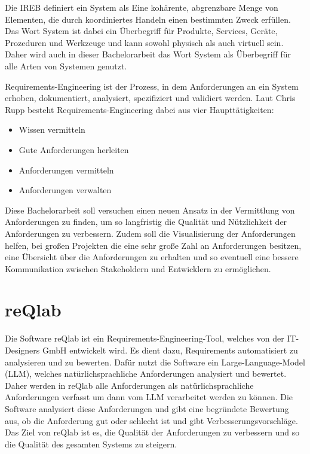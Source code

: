
    Die IREB definiert ein System als \glqq{}Eine kohärente, abgrenzbare Menge von Elementen, die durch koordiniertes Handeln einen bestimmten Zweck erfüllen.\grqq{} \autocite[][]{ireb_cpre_glossary}
    Das Wort System ist dabei ein Überbegriff für Produkte, Services, Geräte, Prozeduren und Werkzeuge und kann sowohl physisch als auch virtuell sein.
    Daher wird auch in dieser Bachelorarbeit das Wort System als Überbegriff für alle Arten von Systemen genutzt.


    Requirements-Engineering ist der Prozess, in dem Anforderungen an ein System erhoben, dokumentiert, analysiert, spezifiziert und validiert werden.
    Laut Chris Rupp besteht Requirements-Engineering dabei aus vier Haupttätigkeiten:
    \begin{itemize}
        \item Wissen vermitteln
        \item Gute Anforderungen herleiten
        \item Anforderungen vermitteln
        \item Anforderungen verwalten
    \end{itemize}
    \autocite[][S.20]{Rupp2014}

    Diese Bachelorarbeit soll versuchen einen neuen Ansatz in der Vermittlung von Anforderungen zu finden, um so langfristig die Qualität und Nützlichkeit der Anforderungen zu verbessern.
    Zudem soll die Visualisierung der Anforderungen helfen, bei großen Projekten die eine sehr große Zahl an Anforderungen besitzen, eine Übersicht über die Anforderungen zu erhalten und so eventuell eine bessere Kommunikation zwischen Stakeholdern und Entwicklern zu ermöglichen.

  \section{reQlab}

  Die Software reQlab ist ein Requirements-Engineering-Tool, welches von der IT-Designers GmbH entwickelt wird.
  Es dient dazu, Requirements automatisiert zu analysieren und zu bewerten.
  Dafür nutzt die Software ein Large-Language-Model (LLM), welches natürlichsprachliche Anforderungen analysiert und bewertet.
  Daher werden in reQlab alle Anforderungen als natürlichsprachliche Anforderungen verfasst um dann vom LLM verarbeitet werden zu können.
  Die Software analysiert diese Anforderungen und gibt eine begründete Bewertung aus, ob die Anforderung gut oder schlecht ist und gibt Verbesserungsvorschläge.
  Das Ziel von reQlab ist es, die Qualität der Anforderungen zu verbessern und so die Qualität des gesamten Systems zu steigern.


